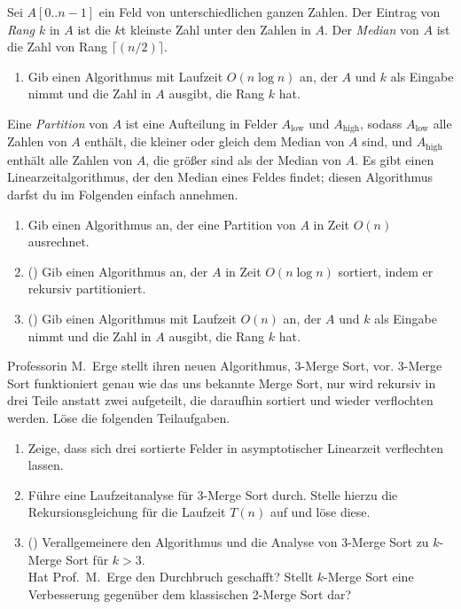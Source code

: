 \documentclass{uebung_cs}
\begin{document}
\begin{aufgabe}
Sei $A[0..n-1]$ ein Feld von unterschiedlichen ganzen Zahlen.
Der Eintrag von \emph{Rang $k$} in $A$ ist die $k$t kleinste Zahl unter den Zahlen in $A$.
Der \emph{Median} von $A$ ist die Zahl von Rang $\lceil(n/2)\rceil$.
\begin{enumerate}
	\item Gib einen Algorithmus mit Laufzeit $O(n\log n)$ an, der $A$ und $k$ als Eingabe nimmt und die Zahl in $A$ ausgibt, die Rang $k$ hat.
\end{enumerate}
Eine \emph{Partition} von $A$ ist eine Aufteilung in Felder $A_\text{low}$ und $A_\text{high}$, sodass $A_\text{low}$ alle Zahlen von $A$ enthält, die kleiner oder gleich dem Median von $A$ sind, und $A_\text{high}$ enthält alle Zahlen von $A$, die größer sind als der Median von $A$.
Es gibt einen Linearzeitalgorithmus, der den Median eines Feldes findet; diesen Algorithmus darfst du im Folgenden einfach annehmen.
\begin{enumerate}[resume]
	\item Gib einen Algorithmus an, der eine Partition von $A$ in Zeit $O(n)$ ausrechnet.
	\item (\hard) Gib einen Algorithmus an, der $A$ in Zeit $O(n\log n)$ sortiert, indem er rekursiv partitioniert.
	\item (\veryhard) Gib einen Algorithmus mit Laufzeit $O(n)$ an, der $A$ und $k$ als Eingabe nimmt und die Zahl in $A$ ausgibt, die Rang $k$ hat.
\end{enumerate}
\end{aufgabe}


\begin{aufgabe}
	Professorin M.\ Erge stellt ihren neuen Algorithmus, 3-Merge Sort, vor.
	3-Merge Sort funktioniert genau wie das uns bekannte Merge Sort, nur wird rekursiv in drei Teile anstatt zwei aufgeteilt, die daraufhin sortiert und wieder verflochten werden.
	Löse die folgenden Teilaufgaben.
	\begin{enumerate}
		\item Zeige, dass sich drei sortierte Felder in asymptotischer Linearzeit verflechten lassen.
		\item Führe eine Laufzeitanalyse für 3-Merge Sort durch. Stelle hierzu die Rekursionsgleichung für die Laufzeit $T(n)$ auf und löse diese.
		\item (\hard) Verallgemeinere den Algorithmus und die Analyse von 3-Merge Sort zu $k$-Merge Sort für $k>3$.\\
		Hat Prof.\ M.\ Erge den Durchbruch geschafft?
		Stellt $k$-Merge Sort eine Verbesserung gegenüber dem klassischen 2-Merge Sort dar?
	\end{enumerate}
\end{aufgabe}
\end{document}
